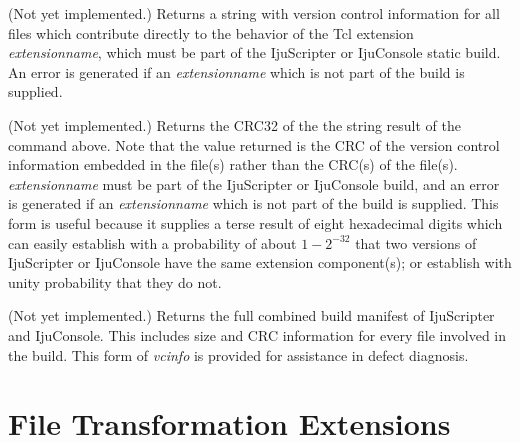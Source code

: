 \begin{tclcommanddescription}
\begin{tclcommandinternaldescription}
(Not yet implemented.)  Returns a string with version control information for all
files which contribute directly to the behavior of the Tcl extension \emph{extensionname},
which must be part of the IjuScripter or IjuConsole static build.
An error is generated if an \emph{extensionname} which is not part of the build
is supplied.
\end{tclcommandinternaldescription}

\begin{tclcommandinternaldescription}
(Not yet implemented.)  Returns the CRC32 of the the string result of the command above.
Note that the value returned is the CRC of the version control information embedded in the file(s)
rather than the CRC(s) of the file(s).
\emph{extensionname} must be part of the IjuScripter or IjuConsole build, and
an error is generated if an \emph{extensionname} which is not part of the build is supplied.
This form is
useful because it supplies a terse result of eight hexadecimal digits which can easily
establish with a probability of about $1-2^{-32}$ that two versions of IjuScripter or IjuConsole
have the same extension component(s); or establish with unity probability that they do not.
\end{tclcommandinternaldescription}

\begin{tclcommandinternaldescription}
(Not yet implemented.)  Returns the full combined build manifest of IjuScripter and IjuConsole.
This includes size and CRC information for every file involved in the build.  This form
of \emph{vcinfo} is provided for assistance in defect diagnosis.
\end{tclcommandinternaldescription}

\end{tclcommanddescription}


\section{File Transformation Extensions}


